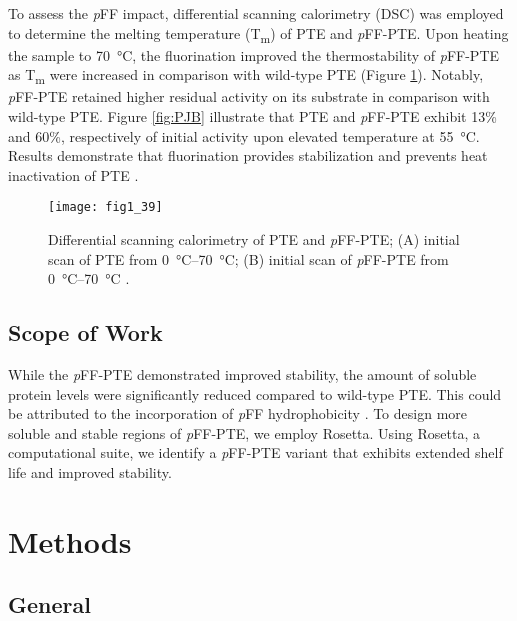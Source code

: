 \begin{refsection}
To assess the \emph{p}FF impact, differential scanning calorimetry (DSC) was
employed to determine the melting temperature (T\textsubscript{m}) of PTE and
\emph{p}FF-PTE. Upon heating the sample to \SI{70}{\celsius}, the fluorination
improved the thermostability of \emph{p}FF-PTE as T\textsubscript{m} were
increased in comparison with wild-type PTE \cite{Baker2011b} (Figure
\ref{fig:PJB-DSC}).  Notably, \emph{p}FF-PTE retained higher residual activity
on its substrate in comparison with wild-type PTE. Figure \ref{fig:PJB}
illustrate that PTE and \emph{p}FF-PTE exhibit 13\% and 60\%, respectively of
initial activity upon elevated temperature at \SI{55}{\celsius}. Results
demonstrate that fluorination provides stabilization and prevents heat
inactivation of PTE \cite{Baker2011b}.
\begin{figure}[htbp] \centering \texttt{[image: fig1\_39]}
    \caption[Differential scanning calorimetry of PTE and \emph{p}FF-PTE; (A)
    initial scan of PTE at \SIrange{0}{70}{\celsius}; (B) initial scan of
\emph{p}FF-PTE at \SIrange{0}{70}{\celsius}.]{Differential scanning calorimetry
    of PTE and \emph{p}FF-PTE; (A) initial scan of PTE from
    \SIrange{0}{70}{\celsius}; (B) initial scan of \emph{p}FF-PTE from
    \SIrange{0}{70}{\celsius} \cite{Baker2011b}.} \label{fig:PJB-DSC}
\end{figure}

\subsection{Scope of Work}

While the \emph{p}FF-PTE demonstrated improved stability, the amount of soluble
protein levels were significantly reduced compared to wild-type PTE. This could
be attributed to the incorporation of \emph{p}FF hydrophobicity
\cite{Baker2011b}. To design more soluble and stable regions of \emph{p}FF-PTE,
we employ Rosetta. Using Rosetta, a computational suite, we identify a
\emph{p}FF-PTE variant that exhibits extended shelf life and improved
stability. 

\section{Methods}

\subsection{General}


\end{refsection}
